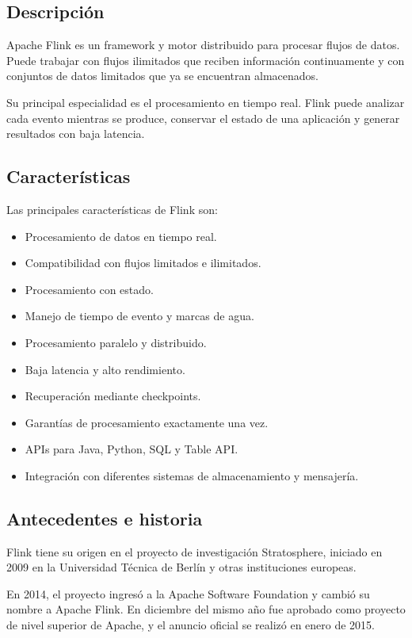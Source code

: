 \subsection{Descripción}

Apache Flink es un framework y motor distribuido para procesar flujos de datos.
Puede trabajar con flujos ilimitados que reciben información continuamente y
con conjuntos de datos limitados que ya se encuentran almacenados.

Su principal especialidad es el procesamiento en tiempo real. Flink puede
analizar cada evento mientras se produce, conservar el estado de una
aplicación y generar resultados con baja latencia.

\subsection{Características}

Las principales características de Flink son:

\begin{itemize}
    \item Procesamiento de datos en tiempo real.
    \item Compatibilidad con flujos limitados e ilimitados.
    \item Procesamiento con estado.
    \item Manejo de tiempo de evento y marcas de agua.
    \item Procesamiento paralelo y distribuido.
    \item Baja latencia y alto rendimiento.
    \item Recuperación mediante checkpoints.
    \item Garantías de procesamiento exactamente una vez.
    \item APIs para Java, Python, SQL y Table API.
    \item Integración con diferentes sistemas de almacenamiento y mensajería.
\end{itemize}

\subsection{Antecedentes e historia}

Flink tiene su origen en el proyecto de investigación Stratosphere, iniciado
en 2009 en la Universidad Técnica de Berlín y otras instituciones europeas.

En 2014, el proyecto ingresó a la Apache Software Foundation y cambió su nombre
a Apache Flink. En diciembre del mismo año fue aprobado como proyecto de nivel
superior de Apache, y el anuncio oficial se realizó en enero de 2015.

